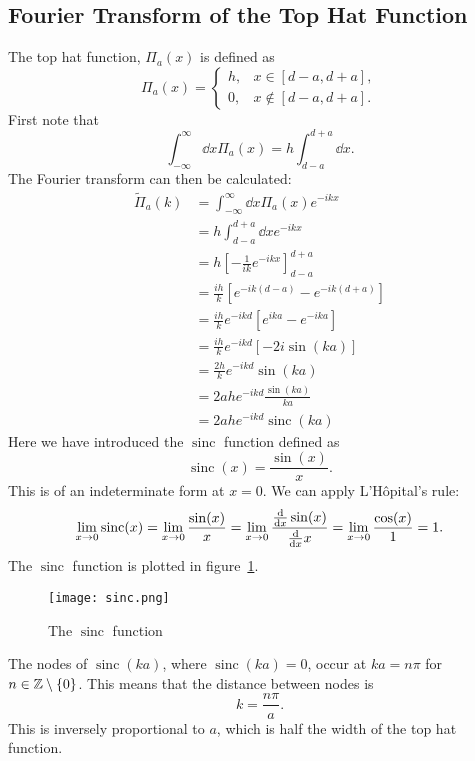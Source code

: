 \documentclass[a4paper]{article}
\DeclareMathOperator{\sinc}{sinc}
\begin{document}
    \subsection{Fourier Transform of the Top Hat Function}
    The top hat function, \(\Pi_a(x)\) is defined as
    \[
        \Pi_a(x) =
        \begin{cases}
            h, & x\in[d - a, d + a],\\
            0, & x\notin[d - a, d + a].
        \end{cases}
    \]
    First note that
    \[\int_{-\infty}^{\infty} \dd{x} \Pi_a(x) = h\int_{d-a}^{d+a} \dd{x}.\]
    The Fourier transform can then be calculated:
    \begin{align*}
        \tilde{\Pi}_a(k) &= \int_{-\infty}^{\infty} \dd{x} \Pi_a(x)e^{-ikx}\\
        &= h\int_{d-a}^{d+a} \dd{x} e^{-ikx}\\
        &= h\left[-\frac{1}{ik}e^{-ikx}\right]_{d-a}^{d+a}\\
        &= \frac{ih}{k}\left[e^{-ik(d-a)} - e^{-ik(d+a)}\right]\\
        &= \frac{ih}{k}e^{-ikd}\left[e^{ika} - e^{-ika}\right]\\
        &= \frac{ih}{k}e^{-ikd}\left[-2i\sin(ka)\right]\\
        &= \frac{2h}{k}e^{-ikd}\sin(ka)\\
        &= 2ahe^{-ikd}\frac{\sin(ka)}{ka}\\
        &= 2ahe^{-ikd}\sinc(ka)
    \end{align*}
    Here we have introduced the \(\sinc\) function defined as
    \[\sinc(x) = \frac{\sin(x)}{x}.\]
    This is of an indeterminate form at \(x = 0\).
    We can apply L'H\^opital's rule:
    \[\lim_{x\to 0}\sinc(x) = \lim_{x\to 0}\frac{\sin(x)}{x} = \lim_{x\to 0}\frac{\dv{x}\sin(x)}{\dv{x}x} = \lim_{x\to 0}\frac{\cos(x)}{1} = 1.\]
    The \(\sinc\) function is plotted in figure~\ref{fig:sinc}.
    \begin{figure}[ht]
        \centering
        \texttt{[image: sinc.png]}
        \caption{The \(\sinc\) function}
        \label{fig:sinc}
    \end{figure}
    The nodes of \(\sinc(ka)\), where \(\sinc(ka) = 0\), occur at \(ka = n\pi\) for \(n\in\mathbb{Z}\setminus\{0\}\).
    This means that the distance between nodes is
    \[k = \frac{n\pi}{a}.\]
    This is inversely proportional to \(a\), which is half the width of the top hat function.
    
\end{document}
